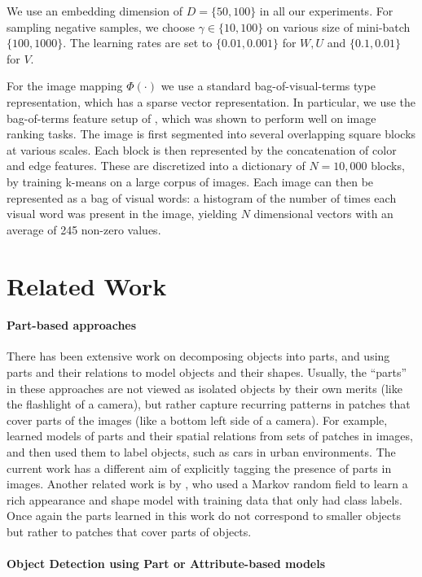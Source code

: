 We use an embedding dimension of $D=\{ 50,100 \}$ in all our experiments. For
sampling negative samples, we choose $\gamma\in\{10,100\}$ on various size of
mini-batch $\{100,1000\}$. The learning rates are set to $\{0.01,0.001\}$ for
$W,U$ and $\{0.1,0.01\}$ for $V$. 

For the image mapping $\Phi(\cdot)$ we use a
standard bag-of-visual-terms type representation, which has
a sparse vector representation. In particular, we use the bag-of-terms 
feature setup of \cite{grangier:2008:tpami}, which
was shown to perform well on image ranking tasks. 
The image is first segmented into several overlapping square blocks at various scales.
Each block is then represented by the concatenation of color and edge features.
These are discretized into a dictionary of $N = 10,000$ blocks,
by training k-means on a large corpus of images. Each image
can then be represented as a bag of visual words: a histogram
of the number of times each visual word was present in the
image, yielding $N$ dimensional vectors with an average of 245 non-zero values. 

\section{Related Work}\label{sec:rwork}

\paragraph{Part-based approaches}
There has been extensive work on decomposing objects into parts, and
using parts and their relations to model objects and their shapes.
Usually, the ``parts'' in these approaches are not viewed as isolated
objects by their own merits (like the flashlight of a camera), but
rather capture recurring patterns in patches that cover parts of the
images (like a bottom left side of a camera).
%
For example, \cite{agarwal2004learning} learned
models of parts and their spatial relations from sets of patches in
images, and then used them to label objects, such as cars in urban
environments. The current work has a different aim of explicitly
tagging the presence of parts in images. Another related work is by
\cite{crandall2006weakly}, who used a Markov random field to learn a
rich appearance and shape model with training data that only had class
labels. Once again the parts learned in this work do not correspond to
smaller objects but rather to patches that cover parts of objects.

\paragraph{Object Detection using Part or Attribute-based models}

